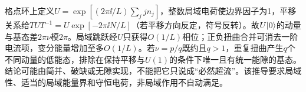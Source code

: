 格点环上定义$U=\exp[(2\pi\ii/L)\sum_jj n_j]$，整数局域电荷使边界因子为1，平移关系给$TU T^{-1}=U\exp[-2\pi\ii N/L]$（若平移方向反定，符号反转）。故$U\lvert 0\rangle$的动量与基态差$2\pi\nu$模$2\pi$。局域跳跃经$U$只获得$O(1/L)$相位；正负扭曲合并可消去一阶电流项，变分能量增加至多$O(1/L)$。若$\nu=p/q$既约且$q>1$，重复扭曲产生$q$个不同动量的低能态，排除在保持平移与$U(1)$的条件下唯一且有统一能隙的基态。结论可能由简并、破缺或无隙实现，不能把它只说成“必然超流”。该推导要求局域性、适当的局域能量界和守恒电荷，非局域作用不自动满足。
